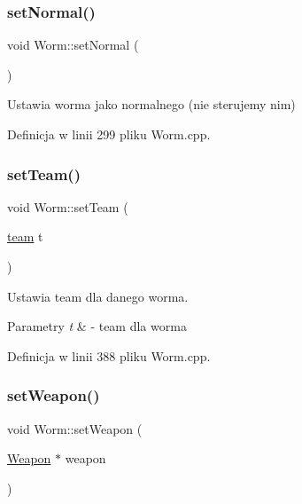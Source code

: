\subsubsection{\texorpdfstring{set\+Normal()}{setNormal()}}
{\footnotesize\ttfamily void Worm\+::set\+Normal (\begin{DoxyParamCaption}{ }\end{DoxyParamCaption})}



Ustawia worma jako normalnego (nie sterujemy nim) 



Definicja w linii 299 pliku Worm.\+cpp.

\mbox{\label{class_worm_a8eb6b3e55c2e6cb7c87b1593f34dac52}} 
\subsubsection{\texorpdfstring{set\+Team()}{setTeam()}}
{\footnotesize\ttfamily void Worm\+::set\+Team (\begin{DoxyParamCaption}\item[{\mbox{\hyperlink{_worm_8h_ae79581ee1998185d7cb41ab84352b97e}{team}}}]{t }\end{DoxyParamCaption})}



Ustawia team dla danego worma. 


\begin{DoxyParams}{Parametry}
{\em t} & -\/ team dla worma \\
\hline
\end{DoxyParams}


Definicja w linii 388 pliku Worm.\+cpp.

\mbox{\label{class_worm_a9f2a337a176e5186c7227880337c98c3}} 
\subsubsection{\texorpdfstring{set\+Weapon()}{setWeapon()}}
{\footnotesize\ttfamily void Worm\+::set\+Weapon (\begin{DoxyParamCaption}\item[{\mbox{\hyperlink{class_weapon}{Weapon}} $\ast$}]{weapon }\end{DoxyParamCaption})}



